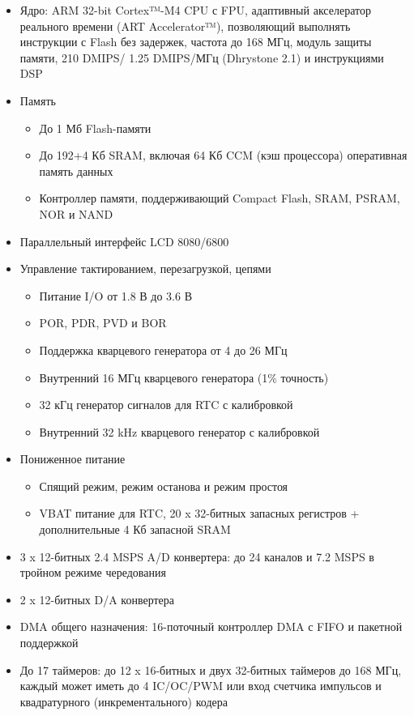 \documentclass[document.tex]{subfiles}
\begin{document}
\begin{itemize}
	\item Ядро: ARM 32-bit Cortex™-M4 CPU с FPU,
адаптивный акселератор реального времени (ART
Accelerator™), позволяющий выполнять инструкции с Flash без задержек, частота до 168 МГц,
модуль защиты памяти, 210 DMIPS/ 1.25 DMIPS/МГц (Dhrystone 2.1) и инструкциями DSP
	\item Память
	\begin{itemize}
		\item До 1 Мб Flash-памяти
		\item До 192+4 Кб SRAM, включая 64 Кб CCM (кэш процессора) оперативная память данных
		\item Контроллер памяти, поддерживающий Compact Flash, SRAM, PSRAM, NOR и NAND
	\end{itemize}
	\item Параллельный интерфейс LCD 8080/6800
	\item Управление тактированием, перезагрузкой, цепями
	\begin{itemize}
		\item Питание I/O от 1.8 В до 3.6 В
		\item POR, PDR, PVD и BOR
		\item Поддержка кварцевого генератора от 4 до 26 МГц
		\item Внутренний 16 МГц кварцевого генератора (1\% точность)
		\item 32 кГц генератор сигналов для RTC с калибровкой
		\item Внутренний 32 kHz кварцевого генератор с калибровкой
	\end{itemize}
	\item Пониженное питание
	\begin{itemize}
		\item Спящий режим, режим останова и режим простоя
		\item VBAT питание для RTC, 20 x 32-битных запасных регистров + дополнительные 4 Кб запасной SRAM
	\end{itemize}
	\item 3 x 12-битных 2.4 MSPS A/D конвертера: до 24 каналов и 7.2 MSPS в тройном режиме чередования
	\item 2 x 12-битных D/A конвертера 
	\item DMA общего назначения: 16-поточный контроллер DMA с FIFO и пакетной поддержкой
	\item До 17 таймеров: до 12 x 16-битных и двух 32-битных таймеров до 168 МГц, каждый может иметь до 4
IC/OC/PWM или вход счетчика импульсов и квадратурного (инкре\-ментального) кодера

\end{itemize}
\end{document}
